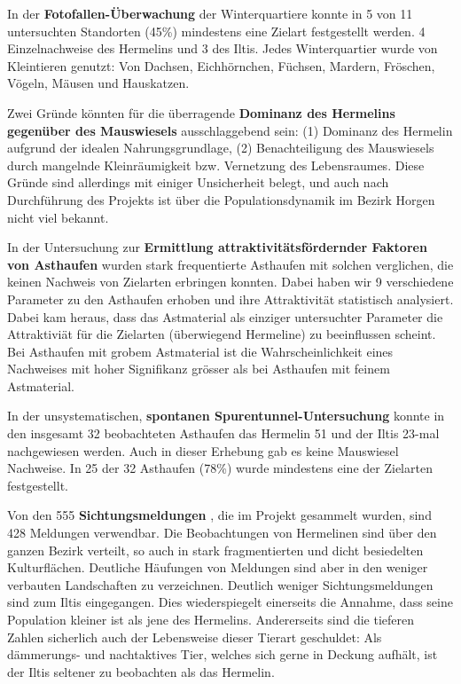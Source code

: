 \documentclass[
  oneside]{scrbook}
\begin{document}
In der \textbf{Fotofallen-Überwachung} der Winterquartiere konnte in 5 von 11 untersuchten Standorten (45\%) mindestens eine Zielart festgestellt werden. 4 Einzelnachweise des Hermelins und 3 des Iltis. Jedes Winterquartier wurde von Kleintieren genutzt: Von Dachsen, Eichhörnchen, Füchsen, Mardern, Fröschen, Vögeln, Mäusen und Hauskatzen.

Zwei Gründe könnten für die überragende \textbf{Dominanz des Hermelins gegenüber des Mauswiesels} ausschlaggebend sein: (1) Dominanz des Hermelin aufgrund der idealen Nahrungsgrundlage, (2) Benachteiligung des Mauswiesels durch mangelnde Kleinräumigkeit bzw. Vernetzung des Lebensraumes. Diese Gründe sind allerdings mit einiger Unsicherheit belegt, und auch nach Durchführung des Projekts ist über die Populationsdynamik im Bezirk Horgen nicht viel bekannt.

In der Untersuchung zur \textbf{Ermittlung attraktivitätsfördernder Faktoren von Asthaufen} wurden stark frequentierte Asthaufen mit solchen verglichen, die keinen Nachweis von Zielarten erbringen konnten. Dabei haben wir 9 verschiedene Parameter zu den Asthaufen erhoben und ihre Attraktivität statistisch analysiert. Dabei kam heraus, dass das Astmaterial als einziger untersuchter Parameter die Attraktiviät für die Zielarten (überwiegend Hermeline) zu beeinflussen scheint. Bei Asthaufen mit grobem Astmaterial ist die Wahrscheinlichkeit eines Nachweises mit hoher Signifikanz grösser als bei Asthaufen mit feinem Astmaterial.

In der unsystematischen, \textbf{spontanen Spurentunnel-Untersuchung} konnte in den insgesamt 32 beobachteten Asthaufen das Hermelin 51 und der Iltis 23-mal nachgewiesen werden. Auch in dieser Erhebung gab es keine Mauswiesel Nachweise. In 25 der 32 Asthaufen (78\%) wurde mindestens eine der Zielarten festgestellt.

Von den 555 \textbf{Sichtungsmeldungen} , die im Projekt gesammelt wurden, sind 428 Meldungen verwendbar. Die Beobachtungen von Hermelinen sind über den ganzen Bezirk verteilt, so auch in stark fragmentierten und dicht besiedelten Kulturflächen. Deutliche Häufungen von Meldungen sind aber in den weniger verbauten Landschaften zu verzeichnen. Deutlich weniger Sichtungsmeldungen sind zum Iltis eingegangen. Dies wiederspiegelt einerseits die Annahme, dass seine Population kleiner ist als jene des Hermelins. Andererseits sind die tieferen Zahlen sicherlich auch der Lebensweise dieser Tierart geschuldet: Als dämmerungs- und nachtaktives Tier, welches sich gerne in Deckung aufhält, ist der Iltis seltener zu beobachten als das Hermelin.
\end{document}

